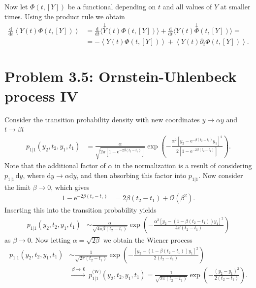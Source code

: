 \documentclass[english, parskip=full]{scrartcl}
\newcommand{\kla}{}
\newcommand{\klam}{}
\newcommand{\tecxt}{}
\newcommand{\e}{\text{e}}
\begin{document}
Now let $\Phi(t,[Y])$ be a functional depending on $t$ and all values of $Y$ at smaller times.
Using the product rule we obtain
\begin{align}
\frac{\tecxt\text{d}}{\tecxt\text{d}t}\left\langle Y(t)\Phi(t,[Y]) \right\rangle &= \frac{\tecxt\text{d}}{\tecxt\text{d}t}\langle \overset{\downarrow}{Y}(t) \Phi(t,[Y]) \rangle + \frac{\tecxt\text{d}}{\tecxt\text{d}t}\langle Y(t)\overset{\downarrow}{\Phi}(t,[Y]) \rangle = \\
&= -\left\langle Y(t)\Phi(t,[Y]) \right\rangle + \left\langle Y(t)\partial_t\Phi(t,[Y]) \right\rangle.
\end{align}

\newpage
\section*{Problem 3.5: Ornstein-Uhlenbeck process IV}
Consider the transition probability density with new coordinates $y\rightarrow \alpha y$ and $t\rightarrow \beta t$
\begin{align}
p_{1|1}(y_2,t_2,y_1,t_1) &= \frac{\alpha}{\sqrt{2\pi\klam\left[ 1 - \e^{-2\beta (t_2-t_1)} \right]}} \exp\kla\left( -\frac{\alpha^2\klam\left[ y_2 - \e^{-\beta(t_2 - t_1)} y_1 \right]^2}{2\klam\left[ 1 - \e^{-2\beta (t_2-t_1)} \right]} \right).
\end{align}
Note that the additional factor of $\alpha$ in the normalization is a result of considering $p_{1|1}\,\mathrm{d}y$, where $\mathrm{d}y\rightarrow\alpha \mathrm{d}y$, and then absorbing this factor into $p_{1|1}$.
Now consider the limit $\beta\rightarrow 0$, which gives
\begin{align}
1 - \e^{-2\beta (t_2-t_1)} &= 2\beta (t_2 - t_1) + \mathcal{O}(\beta^2).
\end{align}
Inserting this into the transition probability yields
\begin{align}
p_{1|1}(y_2,t_2,y_1,t_1) &\sim \frac{\alpha}{\sqrt{4\pi\beta (t_2 - t_1)}} \exp\kla\left( -\frac{\alpha^2\klam\left[ y_2 - (1 - \beta (t_2 - t_1)) y_1 \right]^2}{4\beta (t_2 - t_1)} \right)
\end{align}
as $\beta\rightarrow 0$.
Now letting $\alpha = \sqrt{2\beta}$ we obtain the Wiener process
\begin{align}
p_{1|1}(y_2,t_2,y_1,t_1) &\sim \frac{1}{\sqrt{2\pi (t_2 - t_1)}} \exp\kla\left( -\frac{\klam\left[ y_2 - (1 - \beta (t_2 - t_1)) y_1 \right]^2}{2 (t_2 - t_1)} \right)\\
&\overset{\,\beta\rightarrow \, 0}{\longrightarrow} \ p^\tecxt\text{(W)}_{1|1}(y_2,t_2,y_1,t_1) = \frac{1}{\sqrt{2\pi (t_2 - t_1)}} \exp\kla\left( -\frac{\left( y_2 - y_1 \right)^2}{2 (t_2 - t_1)} \right).
\end{align}
\end{document}
